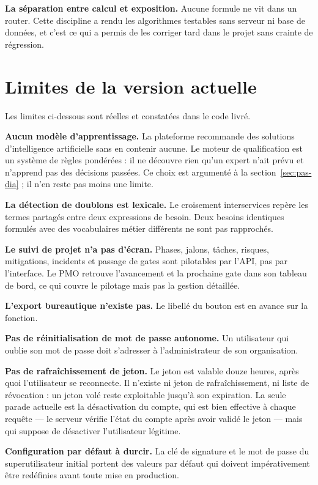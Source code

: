 \textbf{La séparation entre calcul et exposition.} Aucune formule ne vit dans un router.
Cette discipline a rendu les algorithmes testables sans serveur ni base de données, et
c'est ce qui a permis de les corriger tard dans le projet sans crainte de régression.

\section*{Limites de la version actuelle}

Les limites ci-dessous sont réelles et constatées dans le code livré.

\textbf{Aucun modèle d'apprentissage.} La plateforme recommande des solutions
d'intelligence artificielle sans en contenir aucune. Le moteur de qualification est un
système de règles pondérées : il ne découvre rien qu'un expert n'ait prévu et n'apprend
pas des décisions passées. Ce choix est argumenté à la section~\ref{sec:pas-dia} ; il
n'en reste pas moins une limite.

\textbf{La détection de doublons est lexicale.} Le croisement interservices repère les
termes partagés entre deux expressions de besoin. Deux besoins identiques formulés avec
des vocabulaires métier différents ne sont pas rapprochés.

\textbf{Le suivi de projet n'a pas d'écran.} Phases, jalons, tâches, risques,
mitigations, incidents et passage de gates sont pilotables par l'API, pas par
l'interface. Le PMO retrouve l'avancement et la prochaine gate dans son tableau de bord,
ce qui couvre le pilotage mais pas la gestion détaillée.

\textbf{L'export bureautique n'existe pas.} Le libellé du bouton est en avance sur la
fonction.

\textbf{Pas de réinitialisation de mot de passe autonome.} Un utilisateur qui oublie son
mot de passe doit s'adresser à l'administrateur de son organisation.

\textbf{Pas de rafraîchissement de jeton.} Le jeton est valable douze heures, après quoi
l'utilisateur se reconnecte. Il n'existe ni jeton de rafraîchissement, ni liste de
révocation : un jeton volé reste exploitable jusqu'à son expiration. La seule parade
actuelle est la désactivation du compte, qui est bien effective à chaque requête — le
serveur vérifie l'état du compte après avoir validé le jeton — mais qui suppose de
désactiver l'utilisateur légitime.

\textbf{Configuration par défaut à durcir.} La clé de signature et le mot de passe du
superutilisateur initial portent des valeurs par défaut qui doivent impérativement être
redéfinies avant toute mise en production.

